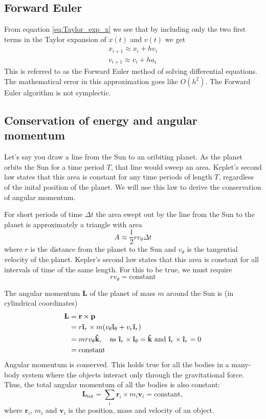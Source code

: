 \documentclass[reprint, english,notitlepage,nofootinbib]{revtex4-1}  %
\newcommand{\ihat}{\boldsymbol{\hat{\textbf{\i}}}}
\newcommand{\khat}{\boldsymbol{\hat{\textbf{k}}}}
\newcommand{\vc}[1]{\mathbf{#1}}
\begin{document}
\subsection{Forward Euler}

From equation \eqref{eq:Taylor_exp_x} we see that by including only the two first terms in the Taylor expansion of $x(t)$ and $v(t)$ we get
\begin{align*}
  x_{i+1} \approx x_i + h v_i \\
  v_{i+1} \approx v_i + h a_i
\end{align*}
This is referred to as the Forward Euler method of solving differential equations. The mathematical error in this approximation goes like $O(h^2)$. The Forward Euler algorithm is not symplectic.


\subsection{Conservation of energy and angular momentum}

Let's say you draw a line from the Sun to an oribiting planet. As the planet orbits the Sun for a time period $T$, that line would sweep an area. Keplet's second law states that this area is constant for any time periods of length $T$, regardless of the inital position of the planet. We will use this law to derive the conservation of angular momentum.

For short periods of time $\Delta t$ the area swept out by the line from the Sun to the planet is approximately a triangle with area
\begin{equation*}
  A \approx \frac{1}{2} r v_\theta \Delta t
\end{equation*}
where $r$ is the distance from the planet to the Sun and $v_\theta$ is the tangential velocity of the planet. Kepler's second law states that this area is constant for all intervals of time of the same length. For this to be true, we must require
\begin{equation*}
  r v_\theta = \text{constant}
\end{equation*}

The angular momentum $\vc L$ of the planet of mass $m$ around the Sun is (in cylindrical coordinates)
\begin{align*}
  \vc L &= \vc r \times \vc p \\
  &= r \ihat_r \times m(v_\theta \ihat_\theta + v_r \ihat_r) \\
  &= m r v_\theta \khat, \quad \text{as } \ihat_r \times \ihat_\theta = \khat \text{ and } \ihat_r \times \ihat_r = 0 \\
  &= \text{constant}
\end{align*}
Angular momentum is conserved. This holds true for all the bodies in a many-body system where the objects interact only through the gravitational force. Thus, the total angular momentum of all the bodies is also constant:
\begin{equation*}
  \vc L_{\text{tot}} = \sum_i \vc r_i \times m_i \vc v_i = \text{constant},
\end{equation*}
where $\vc r_i$, $m_i$ and $\vc v_i$ is the position, mass and velocity of an object.
\end{document}
